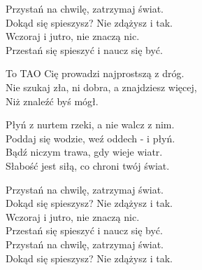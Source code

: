 \begin{text}
    Przystań na chwilę, zatrzymaj świat.\\
    Dokąd się spieszysz? Nie zdążysz i tak.\\
    Wczoraj i jutro, nie znaczą nic.\\
    Przestań się spieszyć i naucz się być.

    \vin To TAO Cię prowadzi najprostszą z dróg.\\
    \vin Nie szukaj zła, ni dobra, a znajdziesz więcej,\\
    \vin Niż znaleźć byś mógł.

    Płyń z nurtem rzeki, a nie walcz z nim.\\
    Poddaj się wodzie, weź oddech - i płyń.\\
    Bądź niczym trawa, gdy wieje wiatr.\\
    Słabość jest siłą, co chroni twój świat.

    Przystań na chwilę, zatrzymaj świat.\\
    Dokąd się spieszysz? Nie zdążysz i tak.\\
    Wczoraj i jutro, nie znaczą nic.\\
    Przestań się spieszyć i naucz się być.\\
    Przystań na chwilę, zatrzymaj świat.\\
    Dokąd się spieszysz? Nie zdążysz i tak.
\end{text}
\begin{chord}

\end{chord}